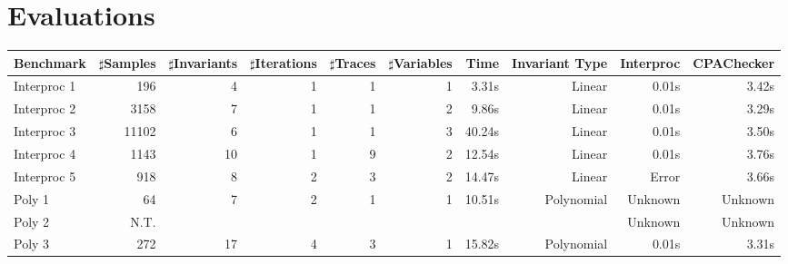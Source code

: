 
\section{Evaluations} %
\label{sec:evaluations}


\begin{table*}[t]
    \begin{center}
    \begin{center}
    \begin{adjustbox}{max width=1\textwidth}
    \begin{tabular}{l | r | r | r | r | r | r | r | r | r}
        \hline\hline
        Benchmark 
            & $\sharp$Samples & $\sharp$Invariants & $\sharp$Iterations 
            & $\sharp$Traces & $\sharp$Variables
            & Time & Invariant Type 
            & Interproc & CPAChecker 
            \\
        \hline
        Interproc 1
            & 196 & 4 & 1 
            & 1 & 1
            & 3.31s & Linear 
            & 0.01s & 3.42s
            \\
        \hline
        Interproc 2
            & 3158 & 7 & 1 
            & 1 & 2
            & 9.86s & Linear 
            & 0.01s & 3.29s
            \\
        \hline
        Interproc 3
            & 11102 & 6 & 1
            & 1 & 3
            & 40.24s & Linear 
            & 0.01s & 3.50s
            \\
        \hline
        Interproc 4
            & 1143 & 10 & 1
            & 9 & 2
            & 12.54s & Linear 
            & 0.01s & 3.76s
            \\
        \hline
        Interproc 5
            & 918 & 8 & 2 
            & 3 & 2
            & 14.47s & Linear 
            & Error & 3.66s
            \\
        \hline
        Poly 1
            & 64 & 7 & 2
            & 1 & 1 
            & 10.51s & Polynomial 
            & Unknown & Unknown 
            \\
        \hline
        Poly 2 
            & N.T. & & 
            & & 
            & & 
            & Unknown & Unknown 
            \\
        \hline
        Poly 3 
            & 272 & 17 & 4 
            & 3 & 1 
            & 15.82s & Polynomial 
            & 0.01s & 3.31s 

\end{tabular}
\end{adjustbox}
\end{center}
\end{center}
\end{table*}

